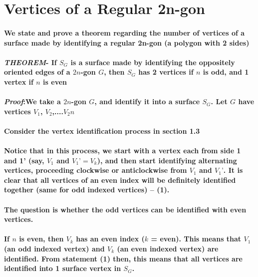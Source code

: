 \documentclass{report}
\begin{document}
\section{Vertices of a Regular 2n-gon}

\paragraph{We state and prove a theorem regarding the number of vertices of a surface made by identifying a regular 2n-gon (a polygon with 2 sides)}

\paragraph{\textit{THEOREM}- If $S_G$ is a surface made by identifying the oppositely oriented edges of a $2n$-gon $G$, then 
$S_G$ has 2 vertices if $n$ is odd, and 1 vertex if $n$ is even}

\paragraph{\textit{Proof}:We take a $2n$-gon $G$, and identify it into a surface $S_G$. Let $G$ have vertices $V_1$, $V_2$,....$V_2n$}

\paragraph{Consider the vertex identification process in section 1.3}

\paragraph{Notice that in this process, we start with a vertex each from side 1 and 1’ (say, $V_1$ and $V_1’ = V_k$), and then start identifying alternating vertices, proceeding clockwise or anticlockwise from $V_1$ and $V_1’$. It is clear that all vertices of an even index will be definitely identified together (same for odd indexed vertices) -- (1).}

\paragraph{The question is whether the odd vertices can be identified with even vertices.}

\paragraph{If $n$ is even, then $V_k$ has an even index ($k$ = even). This means that $V_1$ (an odd indexed vertex) and $V_k$ (an even indexed vertex) are identified. From statement (1) then, this means that all vertices are identified into 1 surface vertex in $S_G$.}
\end{document}
